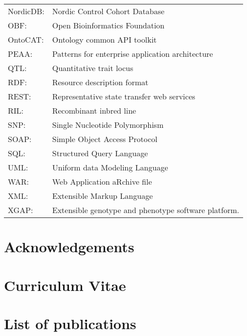 \documentclass[8pt, twoside]{book}
\begin{document}
{\begin{tabular}{ l l }
NordicDB:    & Nordic Control Cohort Database\\
OBF:         & Open Bioinformatics Foundation\\
OntoCAT:     & Ontology common API toolkit\\
PEAA:        & Patterns for enterprise application architecture\\
QTL:         & Quantitative trait locus\\
RDF:         & Resource description format\\
REST:        & Representative state transfer web services\\
RIL:         & Recombinant inbred line \\
SNP:         & Single Nucleotide Polymorphism\\
SOAP:        & Simple Object Access Protocol\\
SQL:         & Structured Query Language\\
UML:         & Uniform data Modeling Language\\
WAR:         & Web Application aRchive file\\
XML:         & Extensible Markup Language\\
XGAP:        & Extensible genotype and phenotype software platform. 
\end{tabular}
}
\newpage

\section*{Acknowledgements}
\lipsum[1]

\newpage

\section*{Curriculum Vitae}

\newpage

\section*{List of publications}
\end{document}
